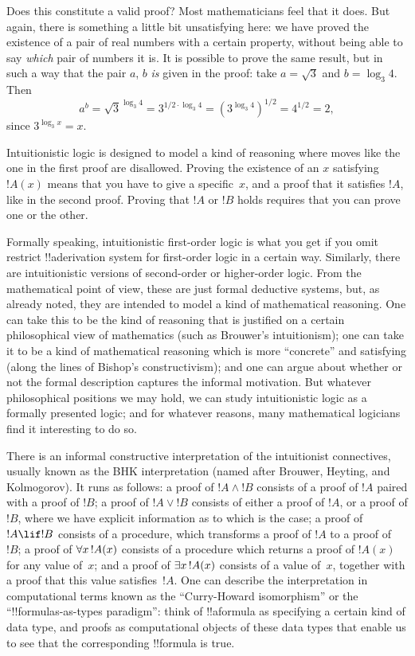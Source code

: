 \documentclass[../../../include/open-logic-section]{subfiles}
\begin{document}
Does this constitute a valid proof? Most mathematicians feel that it
does. But again, there is something a little bit unsatisfying here: we
have proved the existence of a pair of real numbers with a certain
property, without being able to say \emph{which} pair of numbers it
is.  It is possible to prove the same result, but in such a way that
the pair $a$, $b$ \emph{is} given in the proof: take $a = \sqrt{3}$
and $b = \log_3 4$. Then
\[
a^b = \sqrt{3}^{\log_3 4} = 3^{1/2 \cdot \log_3 4} = (3^{\log_3
  4})^{1/2} = 4^{1/2}= 2,
\]
since $3^{\log_3 x} = x$.

Intuitionistic logic is designed to model a kind of reasoning where
moves like the one in the first proof are disallowed. Proving the
existence of an $x$ satisfying~$!A(x)$ means that you have to give a
specific~$x$, and a proof that it satisfies $!A$, like in the second
proof. Proving that $!A$ or $!B$ holds requires that you can prove one
or the other.

Formally speaking, intuitionistic first-order logic is what you get if
you omit restrict !!a{derivation} system for first-order logic in a certain
way. Similarly, there are intuitionistic versions of second-order or
higher-order logic. From the mathematical point of view, these are
just formal deductive systems, but, as already noted, they are
intended to model a kind of mathematical reasoning. One can take this
to be the kind of reasoning that is justified on a certain
philosophical view of mathematics (such as Brouwer's intuitionism);
one can take it to be a kind of mathematical reasoning which is more
``concrete'' and satisfying (along the lines of Bishop's
constructivism); and one can argue about whether or not the formal
description captures the informal motivation. But whatever
philosophical positions we may hold, we can study intuitionistic logic
as a formally presented logic; and for whatever reasons, many
mathematical logicians find it interesting to do so.

There is an informal constructive interpretation of the intuitionist
connectives, usually known as the BHK interpretation (named after
Brouwer, Heyting, and Kolmogorov). It runs as follows: a proof of $!A
\land !B$ consists of a proof of $!A$ paired with a proof of $!B$; a
proof of $!A \lor !B$ consists of either a proof of $!A$, or a proof
of $!B$, where we have explicit information as to which is the case; a
proof of $!A \lif !B$ consists of a procedure, which transforms a
proof of $!A$ to a proof of~$!B$; a proof of $\lforall[x][!A(x)]$
consists of a procedure which returns a proof of $!A(x)$ for any value
of~$x$; and a proof of $\lexists[x][!A(x)]$ consists of a value
of~$x$, together with a proof that this value satisfies~$!A$. One can
describe the interpretation in computational terms known as the
``Curry-Howard isomorphism'' or the ``!!{formula}s-as-types
paradigm'': think of !!a{formula} as specifying a certain kind of
data type, and proofs as computational objects of these data types
that enable us to see that the corresponding !!{formula} is true.
\end{document}
